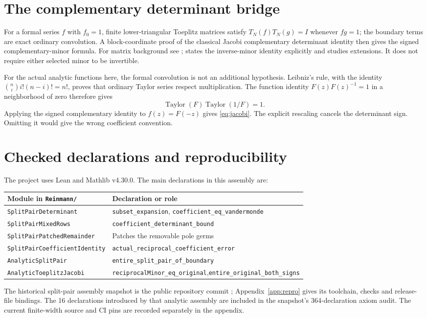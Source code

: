\documentclass[11pt]{amsart}
\begin{document}
\section{The complementary determinant bridge}
For a formal series $f$ with $f_0=1$, finite lower-triangular Toeplitz matrices satisfy
$T_N(f)T_N(g)=I$ whenever $fg=1$; the boundary terms are exact ordinary convolution.
A block-coordinate proof of the classical Jacobi complementary determinant identity then gives the signed complementary-minor formula. For matrix background see \cite{hornjohnson}; \cite{bapat} states the inverse-minor identity explicitly and studies extensions. It does not require either selected minor to be invertible.

For the actual analytic functions here, the formal convolution is not an additional hypothesis. Leibniz's rule, with the identity
$\binom ni i!(n-i)!=n!$, proves that ordinary Taylor series respect multiplication. The function identity $F(z)F(z)^{-1}=1$ in a neighborhood of zero therefore gives
\[
 \operatorname{Taylor}(F)\operatorname{Taylor}(1/F)=1.
\]
Applying the signed complementary identity to $f(z)=F(-z)$ gives \eqref{eq:jacobi}. The explicit rescaling cancels the determinant sign. Omitting it would give the wrong coefficient convention.

\section{Checked declarations and reproducibility}
The project uses Lean and Mathlib v4.30.0. The main declarations in this assembly are:
\begin{center}\footnotesize
\begin{tabular}{p{}p{}}
\toprule
Module in \texttt{Reinmann/} & Declaration or role\\
\midrule
\texttt{SplitPairDeterminant} & \texttt{subset\_expansion}, \texttt{coefficient\_eq\_vandermonde}\\
\texttt{SplitPairMixedRows} & \texttt{coefficient\_determinant\_bound}\\
\texttt{SplitPairPatchedRemainder} & Patches the removable pole germs\\
\texttt{SplitPairCoefficientIdentity} & \texttt{actual\_reciprocal\_coefficient\_error}\\
\texttt{AnalyticSplitPair} & \texttt{entire\_split\_pair\_of\_boundary}\\
\texttt{AnalyticToeplitzJacobi} & \texttt{reciprocalMinor\_eq\_original},\newline \texttt{entire\_original\_both\_signs}\\
\bottomrule
\end{tabular}
\end{center}
\begingroup\raggedright
The historical split-pair assembly snapshot is the public repository commit
; Appendix~\ref{app:repro}
gives its toolchain, checks and release-file bindings. The 16 declarations
introduced by that analytic assembly are included in the snapshot's
364-declaration axiom audit. The current finite-width source and CI pins
are recorded separately in the appendix.
\par\endgroup
\end{document}
